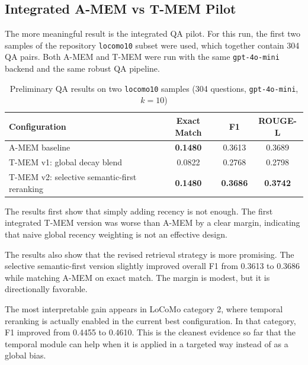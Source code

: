 \documentclass[conference]{IEEEtran}
\begin{document}
\subsection{Integrated A-MEM vs T-MEM Pilot}

The more meaningful result is the integrated QA pilot. For this run, the first two samples of the repository \texttt{locomo10} subset were used, which together contain 304 QA pairs. Both A-MEM and T-MEM were run with the same \texttt{gpt-4o-mini} backend and the same robust QA pipeline.

\begin{table}[htbp]
\caption{Preliminary QA results on two \texttt{locomo10} samples (304 questions, \texttt{gpt-4o-mini}, $k=10$)}
\label{tab:pilot}
\centering
\small
\begin{tabular}{p{4.0cm}ccc}
\toprule
\textbf{Configuration} & \textbf{Exact Match} & \textbf{F1} & \textbf{ROUGE-L} \\
\midrule
A-MEM baseline & \textbf{0.1480} & 0.3613 & 0.3689 \\
T-MEM v1: global decay blend & 0.0822 & 0.2768 & 0.2798 \\
T-MEM v2: selective semantic-first reranking & \textbf{0.1480} & \textbf{0.3686} & \textbf{0.3742} \\
\bottomrule
\end{tabular}
\end{table}

The results first show that simply adding recency is not enough. The first integrated T-MEM version was worse than A-MEM by a clear margin, indicating that naive global recency weighting is not an effective design.

The results also show that the revised retrieval strategy is more promising. The selective semantic-first version slightly improved overall F1 from 0.3613 to 0.3686 while matching A-MEM on exact match. The margin is modest, but it is directionally favorable.

The most interpretable gain appears in LoCoMo category 2, where temporal reranking is actually enabled in the current best configuration. In that category, F1 improved from 0.4455 to 0.4610. This is the cleanest evidence so far that the temporal module can help when it is applied in a targeted way instead of as a global bias.
\end{document}

